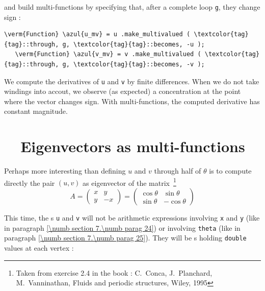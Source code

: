 \noindent and build multi-functions by specifying that, after a complete loop {\small\tt g},
they change sign :

\begin{Verbatim}[commandchars=\\\{\},formatcom=\small\tt,frame=single,
   label=parag-\ref{\numb section 7.\numb parag 25}.cpp,rulecolor=\color{moldura},
   baselinestretch=0.94,framesep=2mm                                              ]
   \verm{Function} \azul{u_mv} = u .make_multivalued ( \textcolor{tag}{tag}::through, g, \textcolor{tag}{tag}::becomes, -u );
   \verm{Function} \azul{v_mv} = v .make_multivalued ( \textcolor{tag}{tag}::through, g, \textcolor{tag}{tag}::becomes, -v );
\end{Verbatim}

We compute the derivatives of {\small\tt u} and {\small\tt v} by finite differences.
When we do not take windings into accout, we observe (as expected) a concentration at the point where
the vector changes sign.
With multi-functions, the computed derivative has constant magnitude.


\section{~~Eigenvectors as multi-functions}  \label{\numb section 7.\numb parag 26}

Perhaps more interesting than defining $u$ and $v$ through half of $ \theta $ is to compute directly
the pair $ (u,v) $ as eigenvector of the matrix$\,$%
\footnote {{} Taken from exercise 2.4 in the book : C.\ Conca, J.\ Planchard,
M.\ Vanninathan, Fluids and periodic structures, Wiley, 1995}
$$ A = \left(\begin{array}{rr} x & y \\ y & -x \end{array}\right)
= \left(\begin{array}{rr} \cos\theta & \sin\theta \\ \sin\theta & -\cos\theta \end{array}\right) $$

This time, the {\small\tt{}}s {\small\tt u} and {\small\tt v} will not be arithmetic
expressions involving {\small\tt x} and {\small\tt y} (like in paragraph
\ref{\numb section 7.\numb parag 24}) or involving {\small\tt theta} (like in paragraph
\ref{\numb section 7.\numb parag 25}).
They will be {\small\tt{}}s holding {\small\tt double} values at each vertex :

